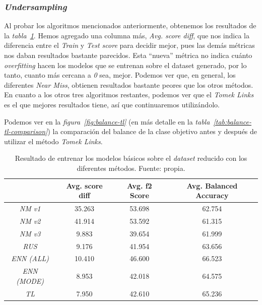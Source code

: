 \subsubsection{\textit{Undersampling}}

Al probar los algoritmos mencionados anteriormente, obtenemos los resultados de la \textit{tabla\ \ref{tab:undersampling-methods}}. 
Hemos agregado una columna más, \textit{Avg. score diff}, que nos indica la diferencia entre el \textit{Train} y \textit{Test score} para decidir mejor, pues las demás métricas nos daban resultados bastante parecidos. Esta ``nueva'' métrica no indica cuánto \textit{overfitting} hacen los modelos que se entrenan sobre el dataset generado, por lo tanto, cuanto más cercana a \textit{0} sea, mejor. Podemos ver que, en general, los diferentes \textit{Near Miss}, obtienen resultados bastante peores que los otros métodos. En cuanto a los otros tres algoritmos restantes, podemos ver que el \textit{Tomek Links} es el que mejores resultados tiene, así que continuaremos utilizándolo.

Podemos ver en la \textit{figura\ \ref{fig:balance-tl}} (en más detalle en la \textit{tabla\ \ref{tab:balance-tl-comparison}}) la comparación del balance de la clase objetivo antes y después de utilizar el método \textit{Tomek Links}. 

\begin{table}[!ht]
    \centering
    \begin{tabular}{|c|ccc|} \hline
        & Avg. score diff & Avg. f2 Score & Avg. Balanced Accuracy \\ \hline
        \textit{NM v1} & 35.263 & 53.698 & 62.754 \\
        \textit{NM v2} & 41.914 & 53.592 & 61.315 \\
        \textit{NM v3} & 9.883 & 39.654 & 61.999 \\
        \textit{RUS} & 9.176 & 41.954 & 63.656 \\
        \textit{ENN (ALL)} & 10.410 & 46.600 & 66.523 \\
        \textit{ENN (MODE)} & 8.953 & 42.018 & 64.575 \\
        \textit{TL} & 7.950 & 42.610 & 65.236 \\ \hline
    \end{tabular}
    \caption{Resultado de entrenar los modelos básicos sobre el \textit{dataset} reducido con los diferentes métodos. Fuente: propia.}\ \label{tab:undersampling-methods}
\end{table}

